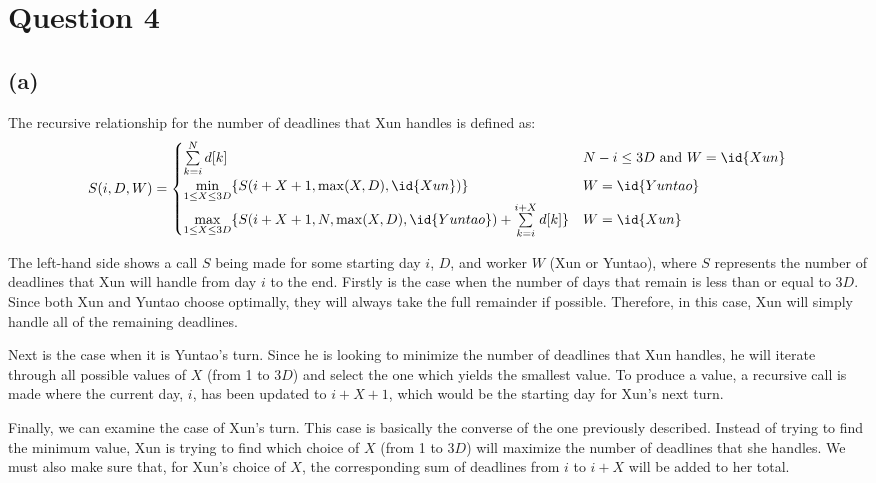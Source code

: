 \section{Question 4}
\subsection{(a)}
The recursive relationship for the number of deadlines that Xun handles is defined as:
\[
    S(i, D, W) = \begin{cases}
        \sum\limits_{k=i}^{N}d[k]                                                                                 & N - i \le 3D \text{ and } W = \id{Xun} \\
        \min\limits_{1 \le X \le 3D} \{S(i + X + 1, \max(X, D), \id{Xun})\}                                       & W = \id{Yuntao}                        \\
        \max\limits_{1 \le X \le 3D} \{S(i + X + 1, N, \max(X, D), \id{Yuntao}) + \sum\limits_{k=i}^{i + X}d[k]\} & W = \id{Xun}
    \end{cases}
\]


The left-hand side shows a call $S$ being made for some starting day $i$, $D$, and worker $W$ (Xun or Yuntao), where $S$ represents the number of deadlines that Xun will handle from day $i$ to the end.
Firstly is the case when the number of days that remain is less than or equal to $3D$.
Since both Xun and Yuntao choose optimally, they will always take the full remainder if possible.
Therefore, in this case, Xun will simply handle all of the remaining deadlines.

Next is the case when it is Yuntao's turn.
Since he is looking to minimize the number of deadlines that Xun handles, he will iterate through all possible values of $X$ (from 1 to $3D$) and select the one which yields the smallest value.
To produce a value, a recursive call is made where the current day, $i$, has been updated to $i + X + 1$, which would be the starting day for Xun's next turn.

Finally, we can examine the case of Xun's turn.
This case is basically the converse of the one previously described.
Instead of trying to find the minimum value, Xun is trying to find which choice of $X$ (from 1 to $3D$) will maximize the number of deadlines that she handles.
We must also make sure that, for Xun's choice of $X$, the corresponding sum of deadlines from $i$ to $i + X$ will be added to her total.

